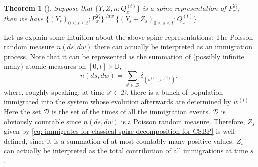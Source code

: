 \documentclass[UTF8]{pkuthss}
\theoremstyle{plain}
\newtheorem{thm}{Theorem}[section]
\theoremstyle{definition}
\numberwithin{equation}{section}
\begin{document}
\begin{thm}[\cite{EckhoffKyprianouWinkel2015Spines,EnglanderKyprianou2004Local,LiuRenSong2009LlogL}]
\label{thm: spine decomposition for CSBP}
	Suppose that $\{Y, Z, n; Q_x^{(t)}\}$ is a spine representation of $P_x^{Y_t}$, then we have $\{(Y_s)_{0\leq s\leq t};P_x^{Y_t}\}\overset{law}{=} \{(Y_s+Z_s)_{0\leq s\leq t}; Q_x^{(t)}\}$. 
\end{thm}

	Let us explain some intuition about the above spine representations: The Poisson random measure $n(ds,dw)$ there can actually be interpreted as an immigration process. Note that it can be represented as the summation of (possibly infinite many) atomic measures on $[0,t]\times \mathbb D$,
\[
	n(ds,dw) = \sum_{s^{i}\in \mathcal D} \delta_{(s^{(i)},w^{(i)})},
\]
	where, roughly speaking, at time $s^{i}\in \mathcal D$, there is a bunch of population immigrated into the system whose evolution afterwards are determined by $w^{(i)}$. 
	Here the set $\mathcal D$ is the set of the times of all the immigration events. 
	$\mathcal D$ is obviously countable since $n(ds,dw)$ is a Poisson random measure. 
	Therefore, $Z_s$ given by \eqref{eq: immigrates for classical spine decomposition for CSBP} is well defined, since it is a summation of at most countably many positive values. 
	$Z_s$ can actually be interpreted as the total contribution of all immigrations at time $s$.
\end{document}
